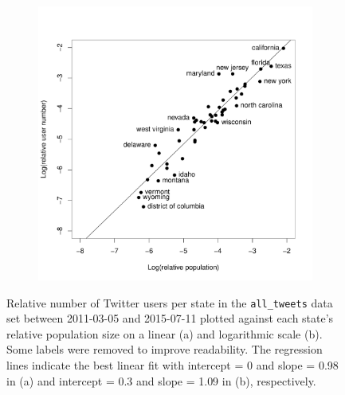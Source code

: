 \documentclass[11pt, a4paper,twoside]{report}\usepackage[]{graphicx}\usepackage[]{color}
\begin{document}
\begin{figure}[htbp!]
  \begin{subfigure}[t]{0.6\textwidth}
  \includegraphics[width=1\linewidth]{19_ScatterTweetPop_user_log.pdf}
  \caption{}
  \label{fig:tweets_state_full_scatter_user_log}
  \end{subfigure}

\caption{Relative number of Twitter users per state in the \texttt{all\_tweets} data set between 2011-03-05 and 2015-07-11 plotted against each state's relative population size on a linear (a) and logarithmic scale (b). Some labels were removed to improve readability. The regression lines indicate the best linear fit with intercept = 0 and slope = 0.98 in (a) and intercept = 0.3 and slope = 1.09 in (b), respectively.}
\end{figure}
\end{document}
